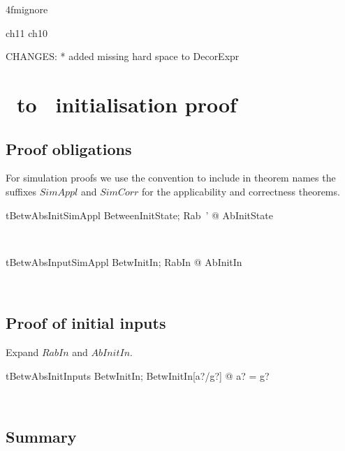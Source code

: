 \ai4fmignore{
\begin{zsection}
  \SECTION ch11 \parents ch10
\end{zsection}
CHANGES:
* added missing hard space to DecorExpr
}
\chapter{\Abs\ to \Betw\ initialisation proof}\label{ch11}

\section{Proof obligations}

For simulation proofs we use the convention to include in theorem
names the suffixes $SimAppl$ and $SimCorr$ for the applicability and
correctness theorems.
%
\begin{LThm}%
\begin{theorem}{tBetwAbsInitSimAppl}
   \forall BetweenInitState; Rab~' @ AbInitState
\end{theorem}~\end{LThm}

\begin{LThm}%
\begin{theorem}{tBetwAbsInputSimAppl}
   \forall BetwInitIn; RabIn @ AbInitIn
\end{theorem}~\end{LThm}

\section{Proof of initial inputs}

Expand $RabIn$ and $AbInitIn$.
\begin{LThm}
\begin{theorem}{tBetwAbsInitInputs}
    \forall BetwInitIn; BetwInitIn[a?/g?] @ a? = g?
\end{theorem}~\end{LThm}

\newpage
\section{Summary}\label{ch11.summary}

\ldefsummary %
\lthmsummary %
\lthmaddeddefsummary %
\lthmaddedthmsummary %
\lzevessummary %
